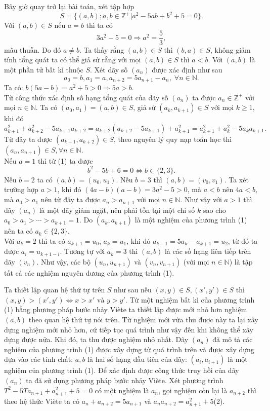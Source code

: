\begin{bt}[VN TST 1992]
{\begin{bode}
		\end{bode}
		Bây giờ quay trở lại bài toán, xét tập hợp
		\[S=\{(a,b);a,b\in \mathbb{Z}^+| a^2-5ab+b^2+5=0 \}. \]
		Với $(a,b)\in S$ nếu $a=b$ thì ta có
		\[ 3a^2-5=0 \Rightarrow a^2 = \dfrac{5}{3}, \] 
		mâu thuẫn. Do đó $a\neq b$. Ta thấy rằng $(a,b)\in S$ thì $(b,a)\in S$, không giảm tính tổng quát ta có thể giả sử rằng với mọi $(a,b)\in S$ thì $a<b$. Với $(a,b)$ là một phần tử bất kì thuộc $S$. Xét dãy số $(a_n)$ được xác định như sau
		\[a_0=b, a_1=a, a_{n+2}=5a_{n+1}-a_n, \; \forall n\in \mathbb{N}. \]
		Ta có: $b(5a-b)=a^2+5>0 \Rightarrow 5a>b. $\\
		Từ công thức xác định số hạng tổng quát của dãy số $(a_n)$ ta được $a_n\in \mathbb{Z}^+$ với mọi $n \in \mathbb{N}$. Ta có $(a_0,a_1)=(a,b) \in S$, giả sử $(a_k,a_{k+1}) \in S$ với mọi $k \geq 1$, khi đó
		\[a_{k+1}^2+a_{k+2}^2-5a_{k+1}a_{k+2}=a_{k+2}(a_{k+2}-5a_{k+1})+a_{k+1}^2=a_{k+1}^2+a_k^2 -5a_ka_{k+1}. \]
		Từ đây ta được $(a_{k+1},a_{k+2})\in S$, theo nguyên lý quy nạp toán học thì $(a_n,a_{n+1}) \in S, \forall n \in \mathbb{N}.$\\
		Nếu $a=1$ thì từ (1) ta được
		\[b^2-5b+6=0 \Leftrightarrow b\in \{2,3\}. \]
		Nếu $b=2$ ta có $(a,b)=(u_0,u_1)$. Nếu $b=3$ thì $(a,b)=(v_0,v_1)$. Ta xét trường hợp $a>1$, khi đó $(4a-b)(a-b)=3a^2-5>0$, mà $a<b$ nên $4a<b$, mà $a_0>a_1$ nên từ đây ta được $a_n>a_{n+1}$ với mọi $n\in \mathbb{N}$. Như vậy với $a>1$ thì dãy $(a_n)$ là một dãy giảm ngặt, nên phải tồn tại một chỉ số $k$ sao cho $a_0>a_1>\cdots > a_{k+1}=1$.  Do $(a_k, a_{k+1})$ là một nghiệm của phương trình (1) nên ta có $a_k\in \{2,3\}.$\\
		Với $a_k=2$ thì ta có $a_{k+1}=u_0$, $a_k=u_1$, khi đó $a_{k-1}=5a_k-a_{k+1}=u_2$, từ đó ta được $a_i=u_{k+1-i}$. Tương tự với $a_k=3$ thì $(a,b)$ là các số hạng liên tiếp trên dãy $(v_n)$. Như vậy, các bộ $(u_n,u_{n+1})$ và $(v_n,v_{n+1})$ (với mọi $n\in \mathbb{N}$) là tập tất cả các nghiệm nguyên dương của phương trình (1).
	}
	\begin{nx}
		Ta thiết lập quan hệ thứ tự trên $S$ như sau nếu $(x,y)\in S, (x',y')\in S$ thì $(x,y)>(x',y') \Leftrightarrow x>x' \text{ và } y>y'$. Từ một nghiệm bất kì của phương trình (1) bằng phương pháp bước nhảy Viète ta thiết lập được mới nhỏ hơn nghiệm $(a,b)$ theo quan hệ thứ tự nói trên. Từ nghiệm mới vừa thu được này ta lại xây dựng nghiệm mới nhỏ hơn, cứ tiếp tục quá trình như vậy đến khi không thể xây dựng được nữa. Khi đó, ta thu được nghiệm nhỏ nhất. Dãy $(a_n)$ đã mô tả các nghiệm của phương trình (1) được xây dựng từ quá trình trên và được xây dựng dựa vào các tính chất: $a,b$ là hai số hạng đầu tiên của dãy: $(a_i,a_{i+1})$  là một nghiệm của phương trình (1). Để xác định được công thức truy hồi của dãy $(a_n)$ ta đã sử dụng phương pháp bước nhảy Viète. Xét phương trình $T^2-5Ta_{n+1}+a_{n+1}^2+5=0$ có một nghiệm là $a_n$, gọi nghiệm còn lại là $a_{n+2}$ thì theo hệ thức Viète ta có $a_n+a_{n+2}=5a_{n+1}$ và $a_na_{n+2}=a_{n+1}^2+5$\hfill (2).\\

\end{nx}
\end{bt}
